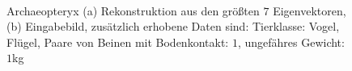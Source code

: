  \begin{figure}
  \centering
  \\
  
  \caption{Archaeopteryx (a) Rekonstruktion aus den größten $7$ Eigenvektoren, (b) Eingabebild, zusätzlich erhobene Daten sind:
  Tierklasse: Vogel, Flügel, Paare von Beinen mit Bodenkontakt: $1$, ungefähres Gewicht: $1$kg}
  \label{archaeopteryx}
 \end{figure}
 
